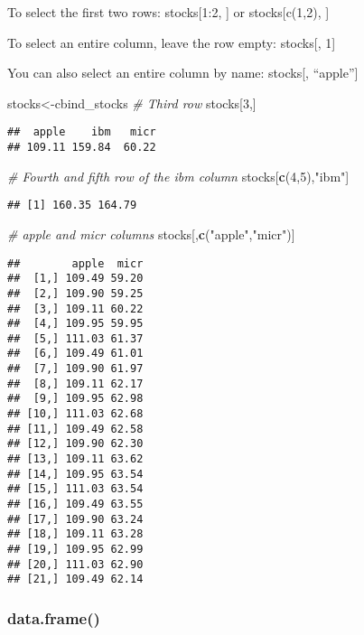\documentclass[]{article}
\newenvironment{Shaded}{\begin{snugshade}}{\end{snugshade}}
\newcommand{\KeywordTok}[1]{\textcolor[rgb]{0.13,0.29,0.53}{\textbf{#1}}}
\newcommand{\DecValTok}[1]{\textcolor[rgb]{0.00,0.00,0.81}{#1}}
\newcommand{\StringTok}[1]{\textcolor[rgb]{0.31,0.60,0.02}{#1}}
\newcommand{\CommentTok}[1]{\textcolor[rgb]{0.56,0.35,0.01}{\textit{#1}}}
\newcommand{\NormalTok}[1]{#1}
\begin{document}
To select the first two rows: stocks{[}1:2, {]} or stocks{[}c(1,2), {]}

To select an entire column, leave the row empty: stocks{[}, 1{]}

You can also select an entire column by name: stocks{[}, ``apple''{]}

\begin{Shaded}
\begin{Highlighting}[]
\NormalTok{stocks<-cbind_stocks}
\CommentTok{# Third row}
\NormalTok{stocks[}\DecValTok{3}\NormalTok{,]}
\end{Highlighting}
\end{Shaded}

\begin{verbatim}
##  apple    ibm   micr 
## 109.11 159.84  60.22
\end{verbatim}

\begin{Shaded}
\begin{Highlighting}[]
\CommentTok{# Fourth and fifth row of the ibm column}
\NormalTok{stocks[}\KeywordTok{c}\NormalTok{(}\DecValTok{4}\NormalTok{,}\DecValTok{5}\NormalTok{),}\StringTok{"ibm"}\NormalTok{]}
\end{Highlighting}
\end{Shaded}

\begin{verbatim}
## [1] 160.35 164.79
\end{verbatim}

\begin{Shaded}
\begin{Highlighting}[]
\CommentTok{# apple and micr columns}
\NormalTok{stocks[,}\KeywordTok{c}\NormalTok{(}\StringTok{"apple"}\NormalTok{,}\StringTok{"micr"}\NormalTok{)]}
\end{Highlighting}
\end{Shaded}

\begin{verbatim}
##        apple  micr
##  [1,] 109.49 59.20
##  [2,] 109.90 59.25
##  [3,] 109.11 60.22
##  [4,] 109.95 59.95
##  [5,] 111.03 61.37
##  [6,] 109.49 61.01
##  [7,] 109.90 61.97
##  [8,] 109.11 62.17
##  [9,] 109.95 62.98
## [10,] 111.03 62.68
## [11,] 109.49 62.58
## [12,] 109.90 62.30
## [13,] 109.11 63.62
## [14,] 109.95 63.54
## [15,] 111.03 63.54
## [16,] 109.49 63.55
## [17,] 109.90 63.24
## [18,] 109.11 63.28
## [19,] 109.95 62.99
## [20,] 111.03 62.90
## [21,] 109.49 62.14
\end{verbatim}

\subsubsection{data.frame()}\label{data.frame}
\end{document}
